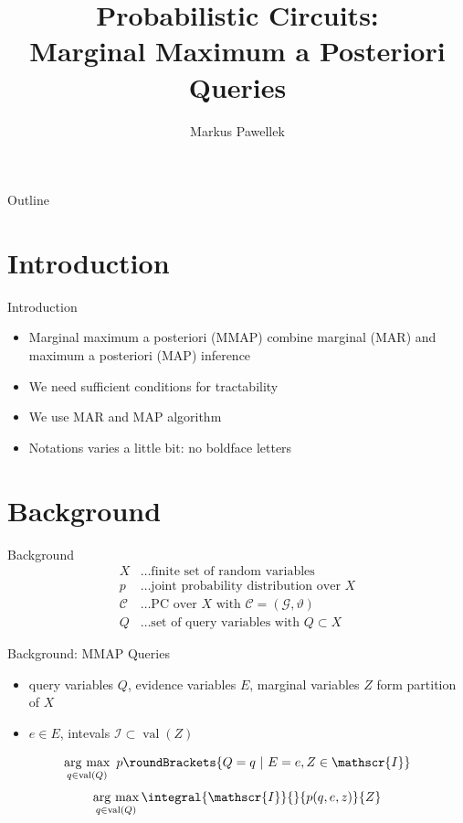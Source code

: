 \documentclass[aspectratio=169]{beamer}
\title{%
  Probabilistic Circuits: \\ Marginal Maximum a Posteriori Queries%
}
\author{Markus Pawellek}
\DeclareMathOperator*{\argmax}{arg\ max}
\DeclareMathOperator{\val}{val}
\begin{document}

\frame[plain]{\titlepage}
\begin{frame}[plain]{Outline}
  \footnotesize
  \hfill\parbox[t][7cm][l]{0.9\textwidth}{\tableofcontents}
\end{frame}
\setcounter{framenumber}{0}

\section{Introduction}
  \begin{frame}{Introduction}
    \begin{itemize}
      \item Marginal maximum a posteriori (MMAP) combine marginal (MAR) and maximum a posteriori (MAP) inference
      \item We need sufficient conditions for tractability
      \item We use MAR and MAP algorithm
      \item Notations varies a little bit: no boldface letters
    \end{itemize}
  \end{frame}

\section{Background}
  \begin{frame}{Background}
    \begin{align*}
      X &\ldots \text{finite set of random variables} \\
      p\, &\ldots \text{joint probability distribution over $X$} \\
      \mathscr{C}\, &\ldots \text{PC over $X$ with $\mathscr{C}=(\mathscr{G},ϑ)$} \\
      Q &\ldots \text{set of query variables with $Q\subset X$}
    \end{align*}
  \end{frame}

  \begin{frame}{Background: MMAP Queries}
    \begin{itemize}
      \item query variables $Q$, evidence variables $E$, marginal variables $Z$ form partition of $X$
      \item $e\in E$, intevals $\mathscr{I}\subset\val(Z)$
    \end{itemize}
    \begin{mybox}
      \[
        \argmax_{q\in\val(Q)} \ p\roundBrackets{Q=q \ | \ E=e,Z\in\mathscr{I}}
      \]
      \[
        \argmax_{q\in\val(Q)} \integral{\mathscr{I}}{}{p(q,e,z)}{Z}
      \]
    \end{mybox}
  \end{frame}
\end{document}
